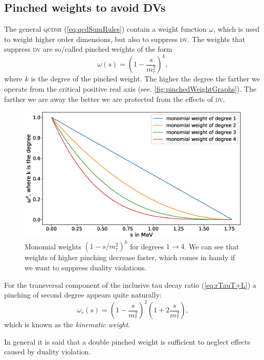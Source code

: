 \documentclass[../../index.tex]{subfiles}
\begin{document}
\subsection{Pinched weights to avoid DVs}
The general \textsc{qcdsr} (\cref{eq:qcdSumRules}) contain a weight function
\(\omega\), which is used to weight higher order dimensions, but also to
suppress \textsc{dv}. The weights that suppress \textsc{dv} are so\-/called
pinched weights of the form
\begin{equation}
  \omega(s) = \left(1-\frac{s}{m_\tau^2}\right)^k,
\end{equation}
where \(k\) is the degree of the pinched weight. The higher the degree the
farther we operate from the critical positive real axis (see.
\cref{fig:pinchedWeightGraphs}). The farther we are away the better we are
protected from the effects of \textsc{dv}.
\begin{figure}
  \centering
  \includegraphics[width=\textwidth]{./images/monomialWeightGraphs.eps}
  \caption{Monomial weights $(1-s/m_\tau^2)^k$ for degrees $1\to4$. We can see
    that weights of higher pinching decrease faster, which comes in handy if we
    want to suppress duality violations.}
  \label{fig:monomialWeightGraphs}
\end{figure}
For the transversal component of the inclusive tau decay ratio (\cref{eq:rTauT+L}) a pinching of second degree appears quite
naturally:  
\begin{equation}
  \label{eq:kinematicWeight}
  \omega_\tau(s) = \left( 1-\frac{s}{m_\tau^2} \right)^2 \left( 1 + 2 \frac{s}{m_\tau^2} \right),
\end{equation}
which is known as the \textit{kinematic weight}.

In general it is said that a double pinched weight is sufficient to neglect
effects caused by duality violation.
\end{document}
